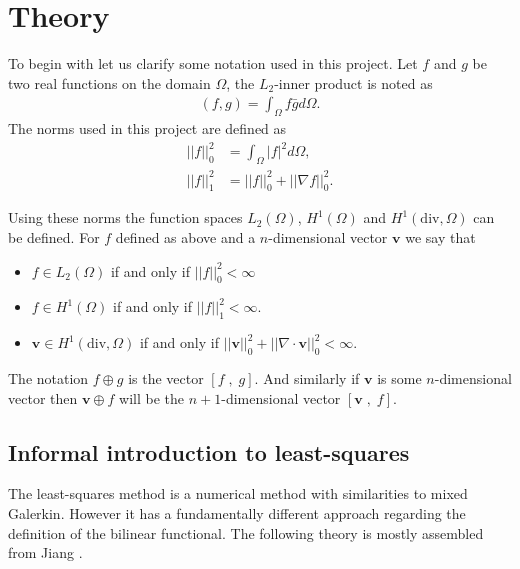 
\chapter{Theory} %

\label{chap:theory} %


To begin with let us clarify some notation used in this project. 
Let $f$ and $g$ be two real functions on the domain $\Omega$, the $L_2$-inner product is noted as
\begin{align}
	(f,g) = \int_{\Omega}f\bar{g}d\Omega.
\end{align}
The norms used in this project are defined as 
\begin{align}
	|| f||_0^2 &= \int_{\Omega}|f|^2d\Omega,\\
	|| f||_1^2 &= || f||_0^2+ ||\nabla f||_0^2.
	\label{eq:norms}
\end{align}

Using these norms the function spaces $L_2(\Omega)$, $H^1(\Omega)$ and $H^1(\text{div},\Omega)$ can be defined.  
For $f$ defined as above and a $n$-dimensional vector $\mathbf{v}$ we say that 
\begin{itemize}
	\item $f \in L_2(\Omega)$ if and only if $||f||_0^2 < \infty$
	\item $f \in H^1(\Omega)$ if and only if $||f||_1^2 < \infty$.
	\item $\mathbf{v} \in H^1(\text{div},\Omega)$ if and only if $||\mathbf{v}||_0^2+||\nabla \cdot \mathbf{v}||_0^2 < \infty$. 

\end{itemize}

The notation $f\oplus g$ is the vector $[ f \;,\; g]$. And similarly if $\mathbf{v}$ is some $n$-dimensional vector then $\mathbf{v}\oplus f$ will be the $n+1$-dimensional vector $[\mathbf{v} \; , \; f]$. 


\section{Informal introduction to least-squares}
The least-squares method is a numerical method with similarities to mixed Galerkin. However it has a fundamentally different approach regarding the definition of the bilinear functional. The following theory is mostly assembled from Jiang \cite{Jiang}. 

